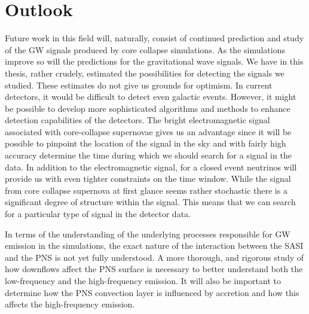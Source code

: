 \section{Outlook}
Future work in this field will, naturally, consist of continued prediction and study of the GW signals produced by core collapse simulations. 
As the simulations improve so will the predictions for the gravitational wave signals. 
We have in this thesis, rather crudely, estimated the possibilities for detecting the signals we studied. 
These estimates do not give us grounds for optimism. In current detectors, it would be difficult to detect even galactic events. 
However, it might be possible to develop more sophisticated algorithms and methods to enhance detection capabilities of the detectors. 
The bright electromagnetic signal associated with core-collapse supernovae gives us an advantage since it will be possible to pinpoint the location of the signal in the sky and with fairly high accuracy determine the time during which we should search for a signal in the data. In addition to the electromagnetic signal, 
for a closed event neutrinos will provide us with even tighter constraints on the time window. 
While the signal from core collapse supernova at first glance seems rather stochastic there is a significant degree of structure within the signal. This means that we can search for a particular type of signal in the detector data. 

In terms of the understanding of the underlying processes responsible for GW emission in the simulations, the exact nature
of the interaction between the SASI and the PNS is not yet fully understood. A more thorough, and rigorous study of
how downflows affect the PNS surface is necessary to better understand both the low-frequency and the high-frequency emission.
It will also be important to determine how the PNS convection layer is influenced by accretion and how this affects
the high-frequency emission.
